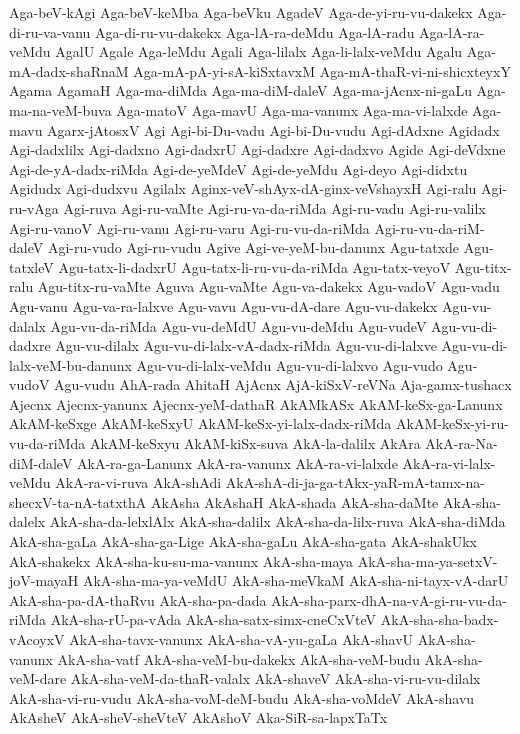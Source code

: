 {Aga-beV-kAgi
Aga-beV-keMba
Aga-beVku
AgadeV
Aga-de-yi-ru-vu-dakekx
Aga-di-ru-va-vanu
Aga-di-ru-vu-dakekx
Aga-lA-ra-deMdu
Aga-lA-radu
Aga-lA-ra-veMdu
AgalU
Agale
Aga-leMdu
Agali
Aga-lilalx
Aga-li-lalx-veMdu
Agalu
Aga-mA-dadx-shaRnaM
Aga-mA-pA-yi-sA-kiSxtavxM
Aga-mA-thaR-vi-ni-shicxteyxY
Agama
AgamaH
Aga-ma-diMda
Aga-ma-diM-daleV
Aga-ma-jAcnx-ni-gaLu
Aga-ma-na-veM-buva
Aga-matoV
Aga-mavU
Aga-ma-vanunx
Aga-ma-vi-lalxde
Aga-mavu
Agarx-jAtosxV
Agi
Agi-bi-Du-vadu
Agi-bi-Du-vudu
Agi-dAdxne
Agidadx
Agi-dadxlilx
Agi-dadxno
Agi-dadxrU
Agi-dadxre
Agi-dadxvo
Agide
Agi-deVdxne
Agi-de-yA-dadx-riMda
Agi-de-yeMdeV
Agi-de-yeMdu
Agi-deyo
Agi-didxtu
Agidudx
Agi-dudxvu
Agilalx
Aginx-veV-shAyx-dA-ginx-veVshayxH
Agi-ralu
Agi-ru-vAga
Agi-ruva
Agi-ru-vaMte
Agi-ru-va-da-riMda
Agi-ru-vadu
Agi-ru-valilx
Agi-ru-vanoV
Agi-ru-vanu
Agi-ru-varu
Agi-ru-vu-da-riMda
Agi-ru-vu-da-riM-daleV
Agi-ru-vudo
Agi-ru-vudu
Agive
Agi-ve-yeM-bu-danunx
Agu-tatxde
Agu-tatxleV
Agu-tatx-li-dadxrU
Agu-tatx-li-ru-vu-da-riMda
Agu-tatx-veyoV
Agu-titx-ralu
Agu-titx-ru-vaMte
Aguva
Agu-vaMte
Agu-va-dakekx
Agu-vadoV
Agu-vadu
Agu-vanu
Agu-va-ra-lalxve
Agu-vavu
Agu-vu-dA-dare
Agu-vu-dakekx
Agu-vu-dalalx
Agu-vu-da-riMda
Agu-vu-deMdU
Agu-vu-deMdu
Agu-vudeV
Agu-vu-di-dadxre
Agu-vu-dilalx
Agu-vu-di-lalx-vA-dadx-riMda
Agu-vu-di-lalxve
Agu-vu-di-lalx-veM-bu-danunx
Agu-vu-di-lalx-veMdu
Agu-vu-di-lalxvo
Agu-vudo
Agu-vudoV
Agu-vudu
AhA-rada
AhitaH
AjAcnx
AjA-kiSxV-reVNa
Aja-gamx-tushacx
Ajecnx
Ajecnx-yanunx
Ajecnx-yeM-dathaR
AkAMkASx
AkAM-keSx-ga-Lanunx
AkAM-keSxge
AkAM-keSxyU
AkAM-keSx-yi-lalx-dadx-riMda
AkAM-keSx-yi-ru-vu-da-riMda
AkAM-keSxyu
AkAM-kiSx-suva
AkA-la-dalilx
AkAra
AkA-ra-Na-diM-daleV
AkA-ra-ga-Lanunx
AkA-ra-vanunx
AkA-ra-vi-lalxde
AkA-ra-vi-lalx-veMdu
AkA-ra-vi-ruva
AkA-shAdi
AkA-shA-di-ja-ga-tAkx-yaR-mA-tamx-na-shecxV-ta-nA-tatxthA
AkAsha
AkAshaH
AkA-shada
AkA-sha-daMte
AkA-sha-dalelx
AkA-sha-da-lelxlAlx
AkA-sha-dalilx
AkA-sha-da-lilx-ruva
AkA-sha-diMda
AkA-sha-gaLa
AkA-sha-ga-Lige
AkA-sha-gaLu
AkA-sha-gata
AkA-shakUkx
AkA-shakekx
AkA-sha-ku-su-ma-vanunx
AkA-sha-maya
AkA-sha-ma-ya-setxV-joV-mayaH
AkA-sha-ma-ya-veMdU
AkA-sha-meVkaM
AkA-sha-ni-tayx-vA-darU
AkA-sha-pa-dA-thaRvu
AkA-sha-pa-dada
AkA-sha-parx-dhA-na-vA-gi-ru-vu-da-riMda
AkA-sha-rU-pa-vAda
AkA-sha-satx-simx-cneCxVteV
AkA-sha-sha-badx-vAcoyxV
AkA-sha-tavx-vanunx
AkA-sha-vA-yu-gaLa
AkA-shavU
AkA-sha-vanunx
AkA-sha-vatf
AkA-sha-veM-bu-dakekx
AkA-sha-veM-budu
AkA-sha-veM-dare
AkA-sha-veM-da-thaR-valalx
AkA-shaveV
AkA-sha-vi-ru-vu-dilalx
AkA-sha-vi-ru-vudu
AkA-sha-voM-deM-budu
AkA-sha-voMdeV
AkA-shavu
AkAsheV
AkA-sheV-sheVteV
AkAshoV
Aka-SiR-sa-lapxTaTx
}
